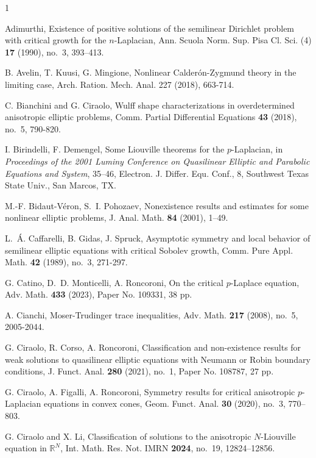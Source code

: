 \documentclass[reqno, 11pt]{amsart} %
\numberwithin{equation}{section}
\theoremstyle{definition}
\begin{document}
\begin{thebibliography}{1}

     Adimurthi, Existence of positive solutions of the semilinear Dirichlet problem with critical growth for the $n$-Laplacian, Ann. Scuola Norm. Sup. Pisa Cl. Sci. (4) {\bf 17} (1990), no.~3, 393--413.

    B. Avelin, T. Kuusi, G. Mingione, Nonlinear Calder\'on-Zygmund theory in the limiting case, Arch. Ration. Mech. Anal. 227 (2018), 663-714.

   C. Bianchini and G. Ciraolo, Wulff shape characterizations in overdetermined anisotropic elliptic problems, Comm. Partial Differential Equations {\bf 43} (2018), no.~5, 790-820.

    I. Birindelli, F. Demengel, Some Liouville theorems for the $p$-Laplacian, in {\it Proceedings of the 2001 Luminy Conference on Quasilinear Elliptic and Parabolic Equations and System}, 35--46, Electron. J. Differ. Equ. Conf., 8, Southwest Texas State Univ., San Marcos, TX.

    M.-F. Bidaut-V\'eron, S.~I. Pohozaev, Nonexistence results and estimates for some nonlinear elliptic problems, J. Anal. Math. {\bf 84} (2001), 1--49.


   L.~\'A. Caffarelli, B. Gidas, J. Spruck, Asymptotic symmetry and local behavior of semilinear elliptic equations with critical Sobolev growth, Comm. Pure Appl. Math. {\bf 42} (1989), no.~3, 271-297.

    G. Catino, D.~D. Monticelli, A. Roncoroni, On the critical $p$-Laplace equation, Adv. Math. {\bf 433} (2023), Paper No. 109331, 38 pp.


   A. Cianchi, Moser-Trudinger trace inequalities, Adv. Math. {\bf 217} (2008), no.~5, 2005-2044.

      G. Ciraolo, R. Corso, A. Roncoroni, Classification and non-existence results for weak solutions to quasilinear elliptic equations with Neumann or Robin boundary conditions, J. Funct. Anal. {\bf 280} (2021), no.~1, Paper No. 108787, 27 pp.

     G. Ciraolo, A. Figalli, A. Roncoroni, Symmetry results for critical anisotropic $p$-Laplacian equations in convex cones, Geom. Funct. Anal. {\bf 30} (2020), no.~3, 770--803.

      G. Ciraolo and X. Li, Classification of solutions to the anisotropic $N$-Liouville equation in $\mathbb R^N$, Int. Math. Res. Not. IMRN {\bf 2024}, no.~19, 12824--12856.


\end{thebibliography}
\end{document}
